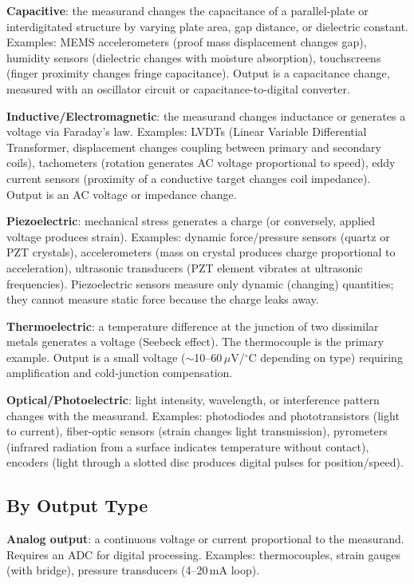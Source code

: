 \documentclass[11pt,letterpaper,twoside,openany]{book}
\newcommand{\degC}{\ensuremath{{}^{\circ}\text{C}}}
\begin{document}
\textbf{Capacitive}: the measurand changes the capacitance of a parallel-plate or interdigitated structure by varying plate area, gap distance, or dielectric constant. Examples: MEMS accelerometers (proof mass displacement changes gap), humidity sensors (dielectric changes with moisture absorption), touchscreens (finger proximity changes fringe capacitance). Output is a capacitance change, measured with an oscillator circuit or capacitance-to-digital converter.

\textbf{Inductive/Electromagnetic}: the measurand changes inductance or generates a voltage via Faraday's law. Examples: LVDTs (Linear Variable Differential Transformer, displacement changes coupling between primary and secondary coils), tachometers (rotation generates AC voltage proportional to speed), eddy current sensors (proximity of a conductive target changes coil impedance). Output is an AC voltage or impedance change.

\textbf{Piezoelectric}: mechanical stress generates a charge (or conversely, applied voltage produces strain). Examples: dynamic force/pressure sensors (quartz or PZT crystals), accelerometers (mass on crystal produces charge proportional to acceleration), ultrasonic transducers (PZT element vibrates at ultrasonic frequencies). Piezoelectric sensors measure only dynamic (changing) quantities; they cannot measure static force because the charge leaks away.

\textbf{Thermoelectric}: a temperature difference at the junction of two dissimilar metals generates a voltage (Seebeck effect). The thermocouple is the primary example. Output is a small voltage ($\sim$10--60\,$\mu$V/\degC{} depending on type) requiring amplification and cold-junction compensation.

\textbf{Optical/Photoelectric}: light intensity, wavelength, or interference pattern changes with the measurand. Examples: photodiodes and phototransistors (light to current), fiber-optic sensors (strain changes light transmission), pyrometers (infrared radiation from a surface indicates temperature without contact), encoders (light through a slotted disc produces digital pulses for position/speed).

\subsection{By Output Type}
\textbf{Analog output}: a continuous voltage or current proportional to the measurand. Requires an ADC for digital processing. Examples: thermocouples, strain gauges (with bridge), pressure transducers (4--20\,mA loop).
\end{document}
